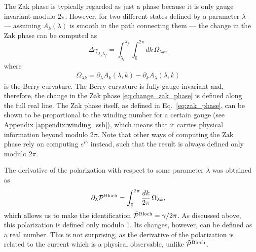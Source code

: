 \documentclass[twocolumn,amsmath,longbibliography,amssymb,superscriptaddress]{revtex4-1}
\begin{document}
The Zak phase is typically regarded as just a phase because it is only gauge invariant modulo $2\pi$. However, for two different states defined by a parameter $\lambda$ --- assuming $A_k(\lambda)$ is smooth in the path connecting them --- the change in the Zak phase can be computed as
\begin{equation}
\Delta {\gamma_{\lambda_i \lambda_f}} = \int_{\lambda_i}^{\lambda_f}\int_{0}^{2\pi} dk \, \Omega_{\lambda k},
\label{eq:change_zak_phase}
\end{equation}
where 
\begin{align}\label{eq:BerryCurvature}
\Omega_{\lambda k} = \partial_\lambda A_k(\lambda,k) - \partial_k A_\lambda(\lambda,k)
\end{align}
 is the Berry curvature. The Berry curvature is fully gauge invariant and, therefore, the change in the Zak phase \eqref{eq:change_zak_phase} is defined along the full real line. The Zak phase itself, as defined in Eq.~\eqref{eq:zak_phase}, can be shown to be proportional to the winding number for a certain gauge (see Appendix \ref{appendix:winding_ssh}), which means that it carries physical information beyond modulo $2\pi$. Note that other ways of computing the Zak phase rely on computing $e^{i\gamma}$ instead, such that the result is always defined only modulo $2\pi$.

The derivative of the polarization with respect to some parameter $\lambda$ was obtained \cite{KingSmith1993} as
\begin{equation}\label{eq:Bloch_polarization}
\partial_\lambda \tilde{\mathcal{P}}^{\rm Bloch} = \int_{0}^{2\pi} \frac{dk}{2\pi} \, \Omega_{\lambda k},
\end{equation}
which allows us to make the identification $ \tilde{\mathcal{P}}^{\rm Bloch} = \gamma/2\pi$. 
As discussed above,  this polarization is defined only modulo 1.
Its changes, however, can be defined as a real number. 
This is not surprising,  as the derivative of the polarization is related to the current which is a physical observable, unlike $\tilde{\mathcal{P}}^{\rm Bloch}$. 
\end{document}
